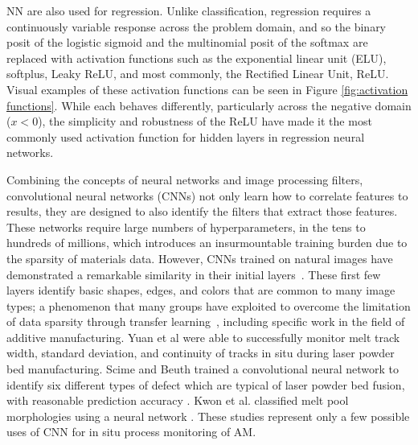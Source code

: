 NN are also used for regression. Unlike classification, regression requires a continuously variable response across the problem domain, and so the binary posit of the logistic sigmoid and the multinomial posit of the softmax are replaced with activation functions such as the exponential linear unit (ELU), softplus, Leaky ReLU, and most commonly, the Rectified Linear Unit, ReLU. Visual examples of these activation functions can be seen in Figure \ref{fig:activation functions}. While each behaves differently, particularly across the negative domain ($x < 0$), the simplicity and robustness of the ReLU have made it the most commonly used activation function for hidden layers in regression neural networks. 

Combining the concepts of neural networks and image processing filters, convolutional neural networks (CNNs) not only learn how to correlate features to results, they are designed to also identify the filters that extract those features. These networks require large numbers of hyperparameters, in the tens to hundreds of millions, which introduces an insurmountable training burden due to the sparsity of materials data. However, CNNs trained on natural images have demonstrated a remarkable similarity in their initial layers~\cite{Yosinski2014}. These first few layers identify basic shapes, edges, and colors that are common to many image types; a phenomenon that many groups have exploited to overcome the limitation of data sparsity through transfer learning~\cite{Ling2017a}, including specific work in the field of additive manufacturing. Yuan et al \cite{Yuan2018} were able to successfully monitor melt track width, standard deviation, and continuity of tracks in situ during laser powder bed manufacturing. Scime and Beuth trained a convolutional neural network to identify six different types of defect which are typical of laser powder bed fusion, with reasonable prediction accuracy \cite{Scime2018}. Kwon et al. classified melt pool morphologies using a neural network \cite{Kwon2018}. These studies represent only a few possible uses of CNN for in situ process monitoring of AM.

